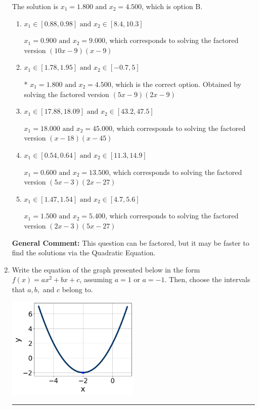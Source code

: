 \documentclass{extbook}[14pt]
\newcommand{\litem}[1]{\item #1

\rule{\textwidth}{0.4pt}}
\begin{document}
\begin{enumerate}
{The solution is \( x_1 = 1.800 \text{ and } x_2 = 4.500 \), which is option B.\begin{enumerate}[label=\Alph*.]
\item \( x_1 \in [0.88, 0.98] \text{ and } x_2 \in [8.4, 10.3] \)

$x_1 = 0.900 \text{ and } x_2 = 9.000$, which corresponds to solving the factored version $(10x -9)(x -9)$
\item \( x_1 \in [1.78, 1.95] \text{ and } x_2 \in [-0.7, 5] \)

* $x_1 = 1.800 \text{ and } x_2 = 4.500$, which is the correct option. Obtained by solving the factored version $(5x -9)(2x -9)$
\item \( x_1 \in [17.88, 18.09] \text{ and } x_2 \in [43.2, 47.5] \)

$x_1 = 18.000 \text{ and } x_2 = 45.000$, which corresponds to solving the factored version $(x -18)(x -45)$
\item \( x_1 \in [0.54, 0.64] \text{ and } x_2 \in [11.3, 14.9] \)

$x_1 = 0.600 \text{ and } x_2 = 13.500$, which corresponds to solving the factored version $(5x -3)(2x -27)$
\item \( x_1 \in [1.47, 1.54] \text{ and } x_2 \in [4.7, 5.6] \)

$x_1 = 1.500 \text{ and } x_2 = 5.400$, which corresponds to solving the factored version $(2x -3)(5x -27)$
\end{enumerate}

\textbf{General Comment:} This question can be factored, but it may be faster to find the solutions via the Quadratic Equation.
}
\litem{
Write the equation of the graph presented below in the form $f(x)=ax^2+bx+c$, assuming  $a=1$ or $a=-1$. Then, choose the intervals that $a, b,$ and $c$ belong to.

\begin{center}
    \includegraphics[width=0.5\textwidth]{../Figures/quadraticGraphToEquationCopyA.png}
\end{center}




}
\end{enumerate}
\end{document}
